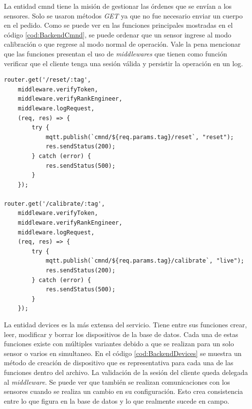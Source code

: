 La entidad cmnd tiene la misión de gestionar las órdenes que se envían a los sensores.
Solo se usaron métodos \emph{GET} ya que no fue necesario enviar un cuerpo en el pedido.
Como se puede ver en las funciones principales mostradas en el código \ref{cod:BackendCmnd}, se puede ordenar que un sensor ingrese al modo calibración o que regrese al modo normal de operación.
Vale la pena mencionar que las funciones presentan el uso de \emph{middlewares} que tienen como función verificar que el cliente tenga una sesión válida y persistir la operación en un log.

\begin{lstlisting}[label=cod:BackendCmnd,caption=Funciones principales de la entidad cmnd]
router.get('/reset/:tag',
    middleware.verifyToken,
    middleware.verifyRankEngineer,
    middleware.logRequest,
    (req, res) => {
        try {
            mqtt.publish(`cmnd/${req.params.tag}/reset`, "reset");
            res.sendStatus(200);
        } catch (error) {
            res.sendStatus(500);
        }
    });

router.get('/calibrate/:tag',
    middleware.verifyToken,
    middleware.verifyRankEngineer,
    middleware.logRequest,
    (req, res) => {
        try {
            mqtt.publish(`cmnd/${req.params.tag}/calibrate`, "live");
            res.sendStatus(200);
        } catch (error) {
            res.sendStatus(500);
        }
    });
\end{lstlisting}

La entidad devices es la más extensa del servicio.
Tiene entre sus funciones crear, leer, modificar y borrar los dispositivos de la base de datos.
Cada una de estas funciones existe con múltiples variantes debido a que se realizan para un solo sensor o varios en simultaneo.
En el código \ref{cod:BackendDevices} se muestra un método de creación de dispositivo que es representativa para cada una de las funciones dentro del archivo.
La validación de la sesión del cliente queda delegada al \emph{middleware}.
Se puede ver que también se realizan comunicaciones con los sensores cuando se realiza un cambio en su configuración.
Esto crea consistencia entre lo que figura en la base de datos y lo que realmente sucede en campo.

